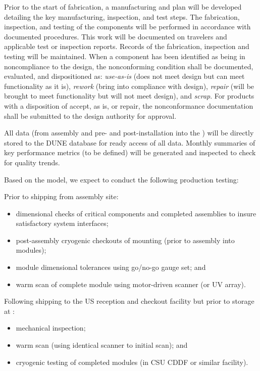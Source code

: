 
Prior to the start of fabrication, a manufacturing and  plan will be developed detailing the key manufacturing, inspection, and test steps.  The fabrication, inspection, and testing of the components will be performed in accordance with documented procedures. This work will be documented on travelers and applicable test or inspection reports. Records of the fabrication, inspection and testing will be maintained. When a component has been identified as being in noncompliance to the design, the nonconforming condition shall be documented, evaluated, and dispositioned as: {\it use-as-is} (does not meet design but can meet functionality as it is), {\it rework} (bring into compliance with design), {\it repair} (will be brought to meet functionality but will not meet design), and {\it scrap}. For products with a disposition of accept, as is, or repair, the nonconformance documentation shall be submitted to the design authority for approval.   

All  data  (from assembly and pre- and post-installation into the ) will be directly stored to the DUNE database for ready access of all  data.  Monthly summaries of key performance metrics (to be defined) will be generated and inspected to check for quality trends.

Based on the  model, we expect to conduct the following production testing:

Prior to shipping from assembly site:
\begin{itemize}
\item dimensional checks of critical components and completed assemblies to insure satisfactory system interfaces;
\item post-assembly cryogenic checkouts of  mounting  (prior to assembly into  modules);
\item module dimensional tolerances using go/no-go gauge set; and
\item warm scan of complete module using motor-driven  scanner (or UV   array).
\end{itemize}

Following shipping to the US reception and checkout facility but prior to storage at :
\begin{itemize}
\item mechanical inspection;
\item warm scan (using identical scanner to initial scan); and
\item cryogenic testing of completed modules (in CSU CDDF or similar facility).
\end{itemize}

